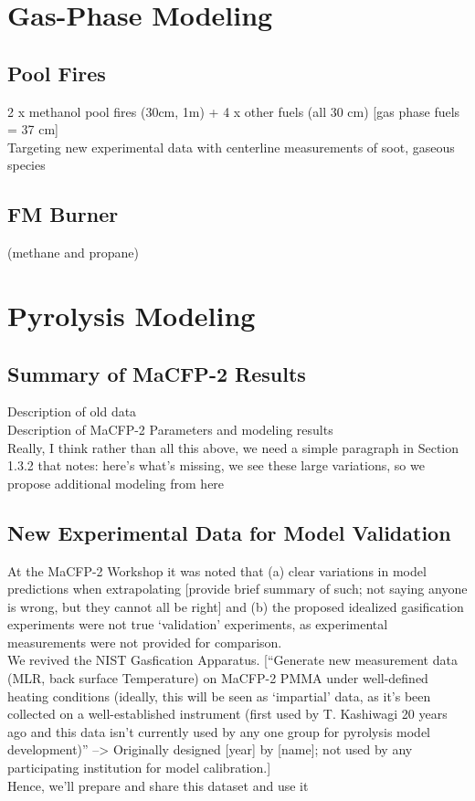 \documentclass[12pt]{article}
\begin{document}
\clearpage
\section{Gas-Phase Modeling}
\subsection{Pool Fires}
2 x methanol pool fires (30cm, 1m) + 4 x other fuels (all 30 cm) [gas phase fuels = 37 cm]\\
Targeting new experimental data with centerline measurements of soot, gaseous species

\subsection{FM Burner}
(methane and propane)
\clearpage
\section{Pyrolysis Modeling}
\subsection{Summary of MaCFP-2 Results}
Description of old data\\
Description of MaCFP-2 Parameters and modeling results\\
Really, I think rather than all this above, we need a simple paragraph in Section 1.3.2 that notes: here's what's missing, we see these large variations, so we propose additional modeling from here


\subsection{New Experimental Data for Model Validation}
At the MaCFP-2 Workshop it was noted that (a) clear variations in model predictions when extrapolating [provide brief summary of such; not saying anyone is wrong, but they cannot all be right] and (b) the proposed idealized gasification experiments were not true `validation' experiments, as experimental measurements were not provided for comparison.\\

We revived the NIST Gasfication Apparatus. [``Generate new measurement data (MLR, back surface Temperature) on MaCFP-2 PMMA under well-defined heating conditions (ideally, this will be seen as ‘impartial’ data, as it’s been collected on a well-established instrument (first used by T. Kashiwagi 20 years ago and this data isn’t currently used by any one group for pyrolysis model development)'' --> Originally designed [year] by [name]; not used by any participating institution for model calibration.] \\
Hence, we'll prepare and share this dataset and use it 
\end{document}
